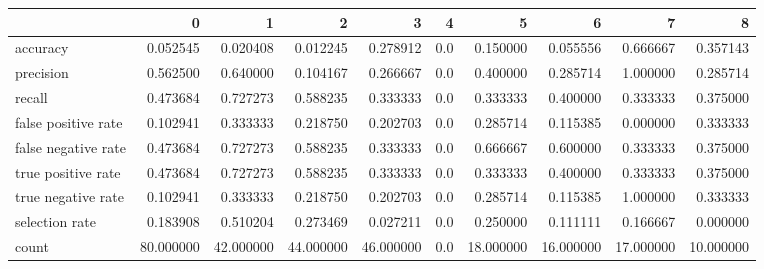 \begin{tabular}{lrrrrrrrrr}
\toprule
{} &          0 &          1 &          2 &          3 &    4 &          5 &          6 &          7 &          8 \\
\midrule
accuracy            &   0.052545 &   0.020408 &   0.012245 &   0.278912 &  0.0 &   0.150000 &   0.055556 &   0.666667 &   0.357143 \\
precision           &   0.562500 &   0.640000 &   0.104167 &   0.266667 &  0.0 &   0.400000 &   0.285714 &   1.000000 &   0.285714 \\
recall              &   0.473684 &   0.727273 &   0.588235 &   0.333333 &  0.0 &   0.333333 &   0.400000 &   0.333333 &   0.375000 \\
false positive rate &   0.102941 &   0.333333 &   0.218750 &   0.202703 &  0.0 &   0.285714 &   0.115385 &   0.000000 &   0.333333 \\
false negative rate &   0.473684 &   0.727273 &   0.588235 &   0.333333 &  0.0 &   0.666667 &   0.600000 &   0.333333 &   0.375000 \\
true positive rate  &   0.473684 &   0.727273 &   0.588235 &   0.333333 &  0.0 &   0.333333 &   0.400000 &   0.333333 &   0.375000 \\
true negative rate  &   0.102941 &   0.333333 &   0.218750 &   0.202703 &  0.0 &   0.285714 &   0.115385 &   1.000000 &   0.333333 \\
selection rate      &   0.183908 &   0.510204 &   0.273469 &   0.027211 &  0.0 &   0.250000 &   0.111111 &   0.166667 &   0.000000 \\
count               &  80.000000 &  42.000000 &  44.000000 &  46.000000 &  0.0 &  18.000000 &  16.000000 &  17.000000 &  10.000000 \\
\bottomrule
\end{tabular}
